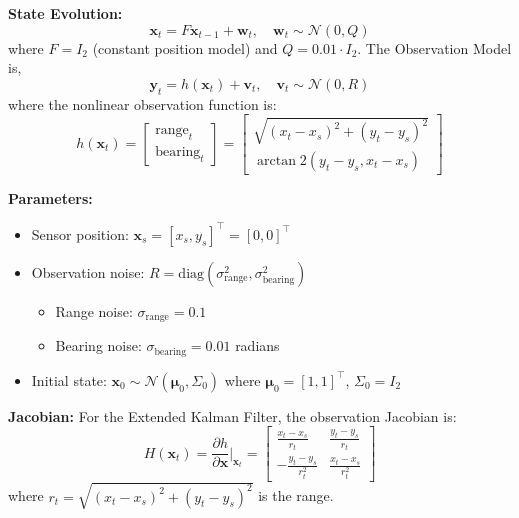 \documentclass{article}
\begin{document}
\textbf{State Evolution:}
\begin{equation}
\mathbf{x}_t = F \mathbf{x}_{t-1} + \mathbf{w}_t, \quad \mathbf{w}_t \sim \mathcal{N}(0, Q)
\end{equation}
where $F = I_2$ (constant position model) and $Q = 0.01 \cdot I_2$. The Observation Model is,
\begin{equation}
\mathbf{y}_t = h(\mathbf{x}_t) + \mathbf{v}_t, \quad \mathbf{v}_t \sim \mathcal{N}(0, R)
\end{equation}
where the nonlinear observation function is:
\begin{equation}
h(\mathbf{x}_t) = \begin{bmatrix}
\text{range}_t \\
\text{bearing}_t
\end{bmatrix} = \begin{bmatrix}
\sqrt{(x_t - x_s)^2 + (y_t - y_s)^2} \\
\arctan2(y_t - y_s, x_t - x_s)
\end{bmatrix}
\end{equation}

\textbf{Parameters:}
\begin{itemize}
    \item Sensor position: $\mathbf{x}_s = [x_s, y_s]^\top = [0, 0]^\top$
    \item Observation noise: $R = \text{diag}(\sigma_{\text{range}}^2, \sigma_{\text{bearing}}^2)$
    \begin{itemize}
        \item Range noise: $\sigma_{\text{range}} = 0.1$
        \item Bearing noise: $\sigma_{\text{bearing}} = 0.01$ radians
    \end{itemize}
    \item Initial state: $\mathbf{x}_0 \sim \mathcal{N}(\boldsymbol{\mu}_0, \Sigma_0)$ where $\boldsymbol{\mu}_0 = [1, 1]^\top$, $\Sigma_0 = I_2$
\end{itemize}

\textbf{Jacobian:} For the Extended Kalman Filter, the observation Jacobian is:
\begin{equation}
H(\mathbf{x}_t) = \frac{\partial h}{\partial \mathbf{x}} \bigg|_{\mathbf{x}_t} = \begin{bmatrix}
\frac{x_t - x_s}{r_t} & \frac{y_t - y_s}{r_t} \\
-\frac{y_t - y_s}{r_t^2} & \frac{x_t - x_s}{r_t^2}
\end{bmatrix}
\end{equation}
where $r_t = \sqrt{(x_t - x_s)^2 + (y_t - y_s)^2}$ is the range.
\end{document}
